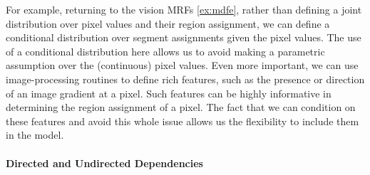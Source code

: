 \documentclass{article}
\begin{document}
\begin{exma}
For example, returning to the vision MRFs \cref{ex:mdfe}, rather than defining a joint distribution over pixel values and their region assignment, we can define a conditional distribution over segment assignments given the pixel values. The use of a conditional distribution here allows us to avoid making a parametric assumption over the (continuous) pixel values. Even more important, we can use image-processing routines to define rich features, such as the presence or direction of an image gradient at a pixel. Such features can be highly informative in determining the region assignment of a pixel.  The fact that we can condition on these features and avoid this whole issue allows us the flexibility to include them in the model. 
\end{exma}
 

\paragraph{Directed and Undirected Dependencies}\label{sec:oasdjcn}
\end{document}
